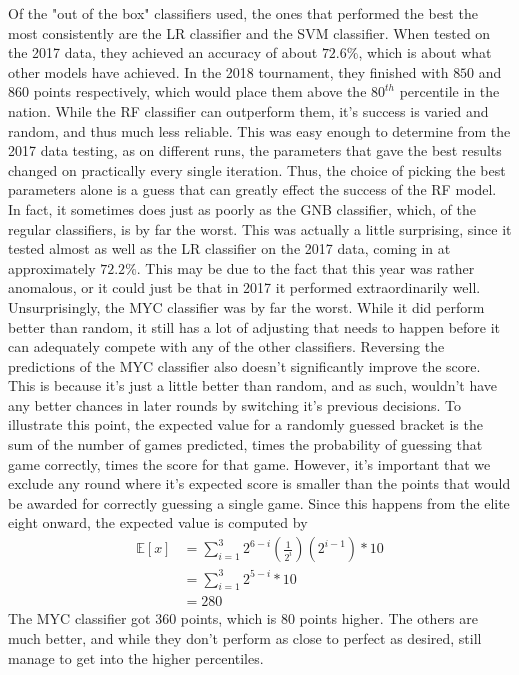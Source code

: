 Of the "out of the box" classifiers used, the ones that performed the best the most consistently are the LR classifier and the SVM classifier.  
When tested on the 2017 data, they achieved an accuracy of about $72.6\%$, which is about what other models have achieved.  
In the 2018 tournament, they finished with $850$ and $860$ points respectively, which would place them above the $80^{th}$ percentile in the nation.  
While the RF classifier can outperform them, it's success is varied and random, and thus much less reliable.  
This was easy enough to determine from the 2017 data testing, as on different runs, the parameters that gave the best results changed on practically every single iteration.  
Thus, the choice of picking the best parameters alone is a guess that can greatly effect the success of the RF model.  
In fact, it sometimes does just as poorly as the GNB classifier, which, of the regular classifiers, is by far the worst.  
This was actually a little surprising, since it tested almost as well as the LR classifier on the 2017 data, coming in at approximately $72.2\%$.  
This may be due to the fact that this year was rather anomalous, or it could just be that in 2017 it performed extraordinarily well.  
Unsurprisingly, the MYC classifier was by far the worst.  
While it did perform better than random, it still has a lot of adjusting that needs to happen before it can adequately compete with any of the other classifiers.  
Reversing the predictions of the MYC classifier also doesn't significantly improve the score.  
This is because it's just a little better than random, and as such, wouldn't have any better chances in later rounds by switching it's previous decisions.  
To illustrate this point, the expected value for a randomly guessed bracket is the sum of the number of games predicted, times the probability of guessing that game correctly, times the score for that game.  
However, it's important that we exclude any round where it's expected score is smaller than the points that would be awarded for correctly guessing a single game.  
Since this happens from the elite eight onward, the expected value is computed by
\begin{align*}
\mathbb{E}[x] &= \sum_{i=1}^{3} 2^{6-i}\left(\frac{1}{2^{i}}\right)\left(2^{i-1}\right)*10 \\
&= \sum_{i=1}^{3} 2^{5-i}*10 \\
&= 280
\end{align*}
The MYC classifier got $360$ points, which is $80$ points higher.  
The others are much better, and while they don't perform as close to perfect as desired, still manage to get into the higher percentiles.  
